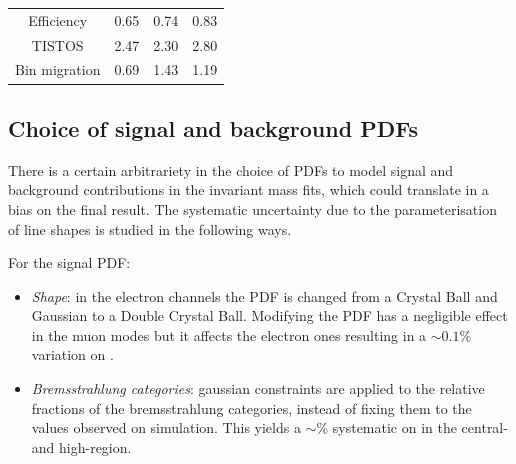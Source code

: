 \begin{table}[h!]
\begin{center}
\begin{tabular}{c|c|c|c}
\hline

Efficiency		        & 0.65          & 0.74	      & 0.83 \\
TISTOS			& 2.47	& 2.30	& 2.80 \\
Bin migration               & 0.69                & 1.43                      & 1.19    \\




\end{tabular}
\end{center}
\end{table}


\subsection{Choice of signal and background PDFs}

There is a certain arbitrariety in the choice of PDFs to model signal and background contributions in the
invariant mass fits, which could translate in a bias on the final result. The systematic uncertainty due to the
parameterisation of line shapes is studied in the following ways.

For the signal PDF:
%
\begin{itemize}

\item \textit{Shape}: in the electron channels the PDF is changed from a Crystal Ball and Gaussian to a Double Crystal Ball.
Modifying the PDF has a negligible effect in the muon modes but it affects the electron ones resulting in a $\sim 0.1\%$
variation on \RKst.

\item \textit{Bremsstrahlung categories}: gaussian constraints are applied to the relative fractions of the bremsstrahlung
categories, instead of fixing them to the values observed on simulation.
This yields a $\sim \%$ systematic on \RKst in the central- and high-\qsq region.


\end{itemize}

